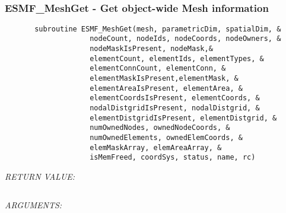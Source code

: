  
\mbox{}\hrulefill\ 
 
\subsubsection [ESMF\_MeshGet] {ESMF\_MeshGet - Get object-wide Mesh information}


  
\begin{verbatim}       subroutine ESMF_MeshGet(mesh, parametricDim, spatialDim, &
                    nodeCount, nodeIds, nodeCoords, nodeOwners, &
                    nodeMaskIsPresent, nodeMask,&
                    elementCount, elementIds, elementTypes, &
                    elementConnCount, elementConn, &
                    elementMaskIsPresent,elementMask, &
                    elementAreaIsPresent, elementArea, &
                    elementCoordsIsPresent, elementCoords, &
                    nodalDistgridIsPresent, nodalDistgrid, &
                    elementDistgridIsPresent, elementDistgrid, &
                    numOwnedNodes, ownedNodeCoords, &
                    numOwnedElements, ownedElemCoords, &
                    elemMaskArray, elemAreaArray, &
                    isMemFreed, coordSys, status, name, rc)\end{verbatim}{\em RETURN VALUE:}
\begin{verbatim} \end{verbatim}{\em ARGUMENTS:}
